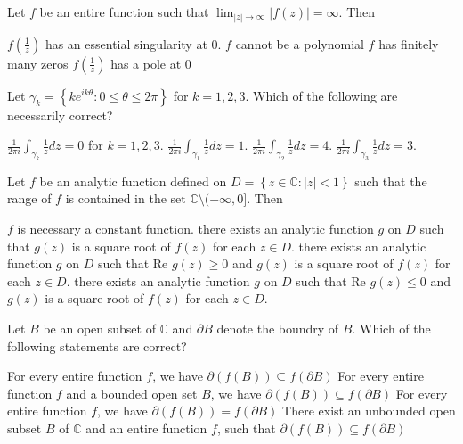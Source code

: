 \documentclass[10pt]{exam}
\newcommand{\C}{\ensuremath{\mathbb{C}}}
\newcommand{\set}[1]{\ensuremath{\left \{ {#1} \right \}}}
\newcommand{\smallb}[1]{\ensuremath{\left ( {#1} \right )}}
\begin{document}
\begin{questions}
\question 
Let $f$ be an entire function such that $\lim_{|z| \rightarrow \infty }|f(z)| = \infty $. Then 

\begin{checkboxes}
\choice $f \smallb{\frac{1}{z}}$ has an essential singularity at $0$. 
\choice $f$ cannot be a polynomial 
\choice $f$ has finitely many zeros 
\choice $ f \smallb{\frac{1}{z}}$ has a pole at $0$ 
\end{checkboxes}

\question 
Let $\gamma_k = \set{ke^{ik\theta}: 0 \leq \theta \leq 2 \pi}$ for $k = 1,2,3$. Which of the following are necessarily correct?

\begin{checkboxes}
\choice $\frac{1}{2 \pi i} \int_{\gamma_k} \frac{1}{z} dz = 0$ for $k = 1,2,3$.
\choice $\frac{1}{2 \pi i} \int_{\gamma_1} \frac{1}{z} dz = 1$.
\choice $\frac{1}{2 \pi i} \int_{\gamma_2} \frac{1}{z} dz = 4$.
\choice $\frac{1}{2 \pi i} \int_{\gamma_3} \frac{1}{z} dz = 3$.
\end{checkboxes}

\question 
Let $f$ be an analytic function defined on $D = \set{z \in \C:|z| < 1}$ such that the range of $f$ is contained in the set $\C \setminus (- \infty ,0]$. Then 

\begin{checkboxes}
\choice $f$ is necessary a constant function.
\choice there exists an analytic function $g$ on $D$ such that $g(z)$ is a square root of $f(z)$ for each $z \in D$.
\choice there exists an analytic function $g$ on $D$ such that Re $g(z) \geq 0$ and $g(z)$ is a square root of $f(z)$ for each $z \in D$.
\choice there exists an analytic function $g$ on $D$ such that Re $g(z) \leq 0$ and $g(z)$ is a square root of $f(z)$ for each $z \in D$.
\end{checkboxes}
 
\question 
Let $B$ be an open subset of $\C$ and $\partial B$ denote the boundry of $B$. Which of the following statements are correct?

\begin{checkboxes}
\choice For every entire function $f$, we have $\partial(f(B)) \subseteq f(\partial B)$
\choice For every entire function $f$ and a bounded open set $B$, we have $\partial(f(B)) \subseteq f(\partial B)$
\choice For every entire function $f$, we have $\partial(f(B)) = f(\partial B)$
\choice There exist an  unbounded open subset $B$ of $\C$ and an entire  function $f$, such that $\partial(f(B)) \subseteq f(\partial B)$
\end{checkboxes}


\end{questions}
\end{document}
